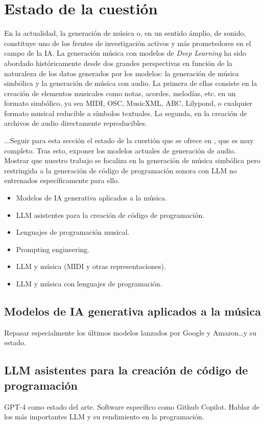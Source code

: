 \chapter{Estado de la cuestión}
\label{chap:estado_cuestion}

En la actualidad, la generación de música o, en un sentido ámplio, de sonido, constituye uno de los frentes de investigación activos y más prometedores en el campo de la IA. La generación música con modelos de \textit{Deep Learning} ha sido abordado históricamente desde dos grandes perspectivas en función de la naturaleza de los datos generados por los modelos: la generación de música simbólica y la generación de música con audio. La primera de ellas consiste en la creación de elementos musicales como notas, acordes, melodías, etc. en un formato simbólico, ya sea MIDI, OSC, MusicXML, ABC, Lilypond, o cualquier formato musical reducible a símbolos textuales. La segunda, en la creación de archivos de audio directamente reproducibles. 

...Seguir para esta sección el estado de la cuestión que se ofrece en \cite{hernandez-olivanSurveyArtificialIntelligence2022}, que es muy completo. 
Tras esto, exponer los modelos actuales de generación de audio.
Mostrar que nuestro trabajo se focaliza en la generación de música simbólica pero restringida a la generación de código de programación sonora con LLM no entrenados específicamente para ello.
 


\begin{itemize}
    \item Modelos de IA generativa aplicados a la música.
    \item LLM asistentes para la creación de código de programación.
    \item Lenguajes de programación musical.
    \item Prompting engineering.
    \item LLM y música (MIDI y otras representaciones).
    \item LLM y música con lenguajes de programación.
\end{itemize}

\section{Modelos de IA generativa aplicados a la música}
    Repasar especialmente los últimos modelos lanzados por Google y Amazon\dots y su estado.

\section{LLM asistentes para la creación de código de programación}
\label{sec:llm_asistentes_creacion_codigo_programacion}
    GPT-4 como estado del arte. Software específico como Github Copilot. Hablar de los más importantes LLM y su rendimiento en la programación.


